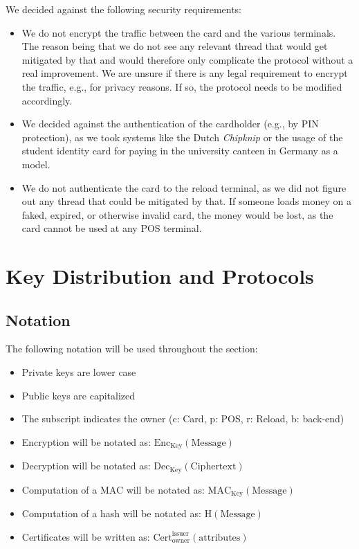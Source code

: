 We decided against the following security requirements:
\begin{itemize}
    \item We do not encrypt the traffic between the card and the various terminals.
    The reason being that we do not see any relevant thread that would get mitigated by that and would therefore only complicate the protocol without a real improvement.
    We are unsure if there is any legal requirement to encrypt the traffic, e.g., for privacy reasons.
    If so, the protocol needs to be modified accordingly.
    
    \item We decided against the authentication of the cardholder (e.g., by PIN protection), as we took systems like the Dutch \emph{Chipknip} or the usage of the student identity card for paying in the university canteen in Germany as a model.

    \item We do not authenticate the card to the reload terminal, as we did not figure out any thread that could be mitigated by that.
    If someone loads money on a faked, expired, or otherwise invalid card, the money would be lost, as the card cannot be used at any POS terminal.
\end{itemize}


\section{Key Distribution and Protocols}
\subsection{Notation}
The following notation will be used throughout the section:
\begin{itemize}
    \item Private keys are lower case
    
    \item Public keys are capitalized
    
    \item The subscript indicates the owner (c: Card, p: POS, r: Reload, b: back-end)
    
    \item Encryption will be notated as: $\textrm{Enc}_{\textrm{Key}}(\textrm{Message})$

    \item Decryption will be notated as: $\textrm{Dec}_{\textrm{Key}}(\textrm{Ciphertext})$
    
    \item Computation of a MAC will be notated as: $\textrm{MAC}_{\textrm{Key}}(\textrm{Message})$
    
    \item Computation of a hash will be notated as: $\textrm{H}(\textrm{Message})$
    
    \item Certificates will be written as: $\textrm{Cert}_\textrm{owner}^\textrm{issuer}(\textrm{attributes})$
\end{itemize}


